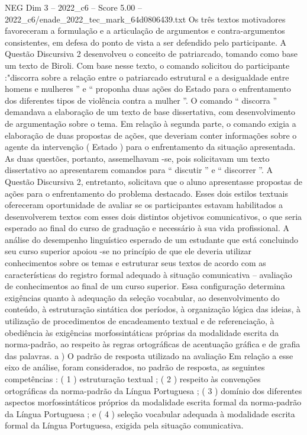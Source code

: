\begin{textsample}{NEG Dim 3 – 2022\_c6 – Score 5.00 – 2022\_c6/enade\_2022\_tec\_mark\_64d0806439.txt}
Os três textos motivadores favoreceram a formulação e a articulação de argumentos e contra-argumentos consistentes, em defesa do ponto de vista a ser defendido pelo participante.
A Questão Discursiva 2 desenvolveu o conceito de patriarcado, tomando como base um texto de Biroli.
Com base nesse texto, o comando solicitou do participante :"discorra sobre a relação entre o patriarcado estrutural e a desigualdade entre homens e mulheres ” e “ proponha duas ações do Estado para o enfrentamento dos diferentes tipos de violência contra a mulher ”.
O comando “ discorra ” demandava a elaboração de um texto de base dissertativa, com desenvolvimento de argumentação sobre o tema.
Em relação à segunda parte, o comando exigia a elaboração de duas propostas de ações, que deveriam conter informações sobre o agente da intervenção ( Estado ) para o enfrentamento da situação apresentada.
As duas questões, portanto, assemelhavam -se, pois solicitavam um texto dissertativo ao apresentarem comandos para “ discutir ” e “ discorrer ”.
A Questão Discursiva 2, entretanto, solicitava que o aluno apresentasse propostas de ações para o enfrentamento do problema destacado.
Esses dois estilos textuais ofereceram oportunidade de avaliar se os participantes estavam habilitados a desenvolverem textos com esses dois distintos objetivos comunicativos, o que seria esperado ao final do curso de graduação e necessário à sua vida profissional.
A análise do desempenho linguístico esperado de um estudante que está concluindo seu curso superior apoiou -se no princípio de que ele deveria utilizar conhecimentos sobre os temas e estruturar seus textos de acordo com as características do registro formal adequado à situação comunicativa – avaliação de conhecimentos ao final de um curso superior.
Essa configuração determina exigências quanto à adequação da seleção vocabular, ao desenvolvimento do conteúdo, à estruturação sintática dos períodos, à organização lógica das ideias, à utilização de procedimentos de encadeamento textual e de referenciação, à obediência às exigências morfossintáticas próprias da modalidade escrita da norma-padrão, ao respeito às regras ortográficas de acentuação gráfica e de grafia das palavras. a ) O padrão de resposta utilizado na avaliação Em relação a esse eixo de análise, foram considerados, no padrão de resposta, as seguintes competências : ( 1 ) estruturação textual ; ( 2 ) respeito às convenções ortográficas da norma-padrão da Língua Portuguesa ; ( 3 ) domínio dos diferentes aspectos morfossintáticos próprios da modalidade escrita formal da norma-padrão da Língua Portuguesa ; e ( 4 ) seleção vocabular adequada à modalidade escrita formal da Língua Portuguesa, exigida pela situação comunicativa.

\end{textsample}
